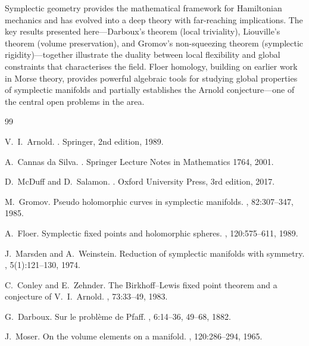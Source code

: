 \documentclass[12pt,a4paper]{amsart}
\theoremstyle{definition}
\begin{document}
Symplectic geometry provides the mathematical framework for Hamiltonian
mechanics and has evolved into a deep theory with far-reaching implications.
The key results presented here---Darboux's theorem (local triviality),
Liouville's theorem (volume preservation), and Gromov's non-squeezing theorem
(symplectic rigidity)---together illustrate the duality between local
flexibility and global constraints that characterises the field.  Floer
homology, building on earlier work in Morse theory, provides powerful algebraic
tools for studying global properties of symplectic manifolds and partially
establishes the Arnold conjecture---one of the central open problems in the
area.

\begin{thebibliography}{99}

V.~I.~Arnold.
.
\newblock Springer, 2nd edition, 1989.

A.~Cannas da Silva.
.
\newblock Springer Lecture Notes in Mathematics 1764, 2001.

D.~McDuff and D.~Salamon.
.
\newblock Oxford University Press, 3rd edition, 2017.

M.~Gromov.
\newblock Pseudo holomorphic curves in symplectic manifolds.
, 82:307--347, 1985.

A.~Floer.
\newblock Symplectic fixed points and holomorphic spheres.
, 120:575--611, 1989.

J.~Marsden and A.~Weinstein.
\newblock Reduction of symplectic manifolds with symmetry.
, 5(1):121--130, 1974.

C.~Conley and E.~Zehnder.
\newblock The Birkhoff--Lewis fixed point theorem and a conjecture of V.~I.~Arnold.
, 73:33--49, 1983.

G.~Darboux.
\newblock Sur le probl\`{e}me de Pfaff.
, 6:14--36, 49--68, 1882.

J.~Moser.
\newblock On the volume elements on a manifold.
, 120:286--294, 1965.

\end{thebibliography}
\end{document}
